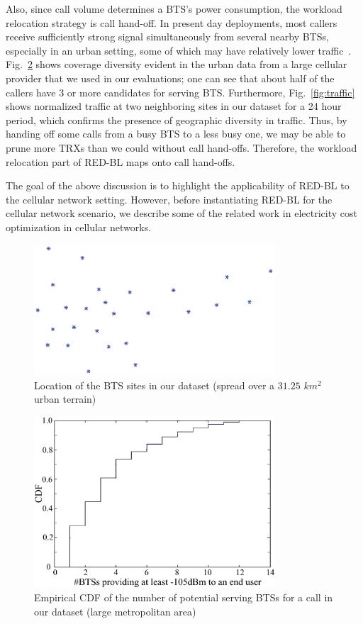 Also, since call volume determines a BTS's power consumption, the workload relocation strategy is call hand-off. In present day deployments, most callers
receive sufficiently strong signal simultaneously from several nearby BTSs, especially in an urban setting, some of which may have relatively lower traffic~\cite{Peng:2011:BTSSaving:Mobicom}. Fig.~\ref{fig:btscdf} shows coverage diversity evident in the urban data from a large cellular provider that we used in our evaluations; one can see that about half of the callers have 3 or more candidates for serving BTS. Furthermore, Fig.~\ref{fig:traffic} shows normalized traffic at two neighboring sites in our dataset for a 24 hour period, which confirms the presence of geographic diversity in traffic. Thus, by handing off some calls from a busy BTS to a less busy one, we may be able to prune more TRXs than we could without call hand-offs. Therefore, the workload relocation part of RED-BL maps onto call hand-offs. 

The goal of the above discussion is to highlight the applicability of RED-BL to the cellular network setting. However, before instantiating RED-BL for the cellular network scenario, we describe some of the related work in electricity cost optimization in cellular networks.

\begin{figure}
{
\centering
\includegraphics[width=0.8\textwidth]{pics/sites.eps}
\caption{Location of the BTS sites in our dataset (spread over a $31.25$ $km^2$ urban terrain)}
\label{fig:sites}
}
\end{figure}

\begin{figure}{
\centering
\includegraphics[width=0.8\textwidth]{pics/coveragecdf.eps}
\caption{Empirical CDF of the number of potential serving BTSs for a call in our dataset (large metropolitan area)}
\label{fig:btscdf}
}
\end{figure}

